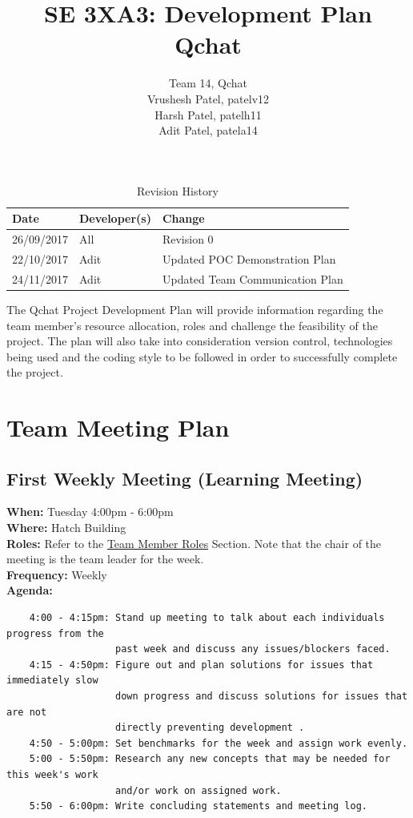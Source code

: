 \documentclass{article}
\title{SE 3XA3: Development Plan\\Qchat}
\author{Team 14, Qchat
		\\ Vrushesh Patel, patelv12
		\\ Harsh Patel, patelh11
		\\ Adit Patel, patela14
}
\date{}
\begin{document}
\maketitle

\newpage

\tableofcontents

\begin{table}[hp]
\caption{Revision History} \label{TblRevisionHistory}
\begin{tabularx}{\textwidth}{llX}
\toprule
\textbf{Date} & \textbf{Developer(s)} & \textbf{Change}\\
\midrule
26/09/2017 & All & Revision 0\\
22/10/2017 & Adit & Updated POC Demonstration Plan \\
24/11/2017 & Adit & Updated Team Communication Plan\\
\bottomrule
\end{tabularx}
\end{table}

\newpage 

The Qchat Project Development Plan will provide information regarding the team member's resource allocation, roles and challenge the feasibility of the project. The plan will also take into consideration version control, technologies being used and the coding style to be followed in order to successfully complete the project. 

\section{Team Meeting Plan}
\subsection{First Weekly Meeting (Learning Meeting)}
\textbf{When:} Tuesday 4:00pm - 6:00pm\\
\textbf{Where:} Hatch Building \\
\textbf{Roles:} Refer to the \hyperref[TeamMemberRoles]{Team Member Roles} Section. Note that the chair of the meeting is the team leader for the week. \\ 
\textbf{Frequency:} Weekly\\
\textbf{Agenda:} 
\begin{verbatim}
    4:00 - 4:15pm: Stand up meeting to talk about each individuals progress from the
                   past week and discuss any issues/blockers faced. 
    4:15 - 4:50pm: Figure out and plan solutions for issues that immediately slow  
                   down progress and discuss solutions for issues that are not 
                   directly preventing development . 
    4:50 - 5:00pm: Set benchmarks for the week and assign work evenly. 
    5:00 - 5:50pm: Research any new concepts that may be needed for this week's work
                   and/or work on assigned work. 
    5:50 - 6:00pm: Write concluding statements and meeting log.
\end{verbatim}
\end{document}
